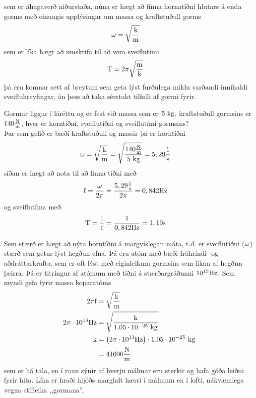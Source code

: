 sem er áhugaverð niðurstaða, núna er hægt að finna hornatíðni hlutars á enda
gorms með einungis upplýsingar um massa og kraftstuðull gorms
\begin{align}
	\omega &= \sqrt{\frac{\text{k}}{\textrm{m}}}
\end{align}
sem er líka hægt að umskrifa til að vera sveiflutími
\begin{align}
	\text{T} &= 2 \pi \sqrt{\frac{\textrm{m}}{\text{k}}}
\end{align}
þá eru komnar sett af breytum sem geta lýst furðulega miklu varðandi innihaldi
sveifluhreyfingar, án þess að taka sérstakt tilfelli af gormi fyrir.

\begin{formalexample}
Gormur liggur í láréttu og er fest við massa sem er $5 \textrm{ k}\textrm{g}$, kraftstuðull
gormsins er $140 \frac{\textrm{N}}{\textrm{m}}$, hver er horntíðni, sveiflutíðni og sveiflutími
gormsins?
\\[4 ex]
Þar sem gefið er bæði kraftstuðull og massir þá er horntíðni
\begin{align*}
	 \omega &= \sqrt{\frac{\text{k}}{\textrm{m}}}
		= \sqrt{\frac{140 \frac{\textrm{N}}{\textrm{m}}}{5 \textrm{ k}\textrm{g}}}
		= 5,29 \frac{\textrm{1}}{\textrm{s}}
\end{align*}
síðan er hægt að nota til að finna tíðni með
\begin{align*}
	\text{f} &= \frac{\omega}{2 \pi}
		= \frac{5,29 \frac{\textrm{1}}{\textrm{s}}}{2 \pi}
		= 0,842 \textrm{Hz}
\end{align*}
og sveiflutíma með
\begin{align*}
	\text{T} &= \frac{1}{\text{f}}
		= \frac{1}{0,842 \textrm{Hz}}
		= 1,19 \textrm{s}
\end{align*}
\end{formalexample}
Sem stærð er hægt að nýta horntíðni á margvíslegan máta, t.d. er sveiflutíðni
($\omega$) stærð sem getur lýst hegðun efna. Þá eru atóm með bæði
fráhrindi- og aðdráttarkrafta, sem er oft lýst með eiginleikum gormsins sem
líkan af hegðun þeirra. Þá er titringur af atómum með tíðni á stærðargráðunni
$10^{13} \textrm{Hz}$. Sem myndi gefa fyrir massa koparatóms
\begin{align*}
	2 \pi \text{f} &= \sqrt{\frac{\text{k}}{ \textrm{m}}} \\
	2 \pi \cdot 10^{13} \textrm{Hz} &= \sqrt{\frac{\text{k}}{ 1.05 \cdot 10^{-25} \textrm{ k}\textrm{g} }} \\
	\text{k} &= \left(2 \pi \cdot 10^{13} \textrm{Hz} \right) \cdot 1.05 \cdot 10^{-25} \textrm{ k}\textrm{g} \\
		&= 41600 \frac{\textrm{N}}{\textrm{m}}
\end{align*}
sem er há tala, en í raun sýnir af hverju málmar eru sterkir og hafa góða leiðni
fyrir hita. Líka er hraði hljóðs margfalt hærri í málmum en í lofti, nákvæmlega vegna
stífleika ,,gormana''.


